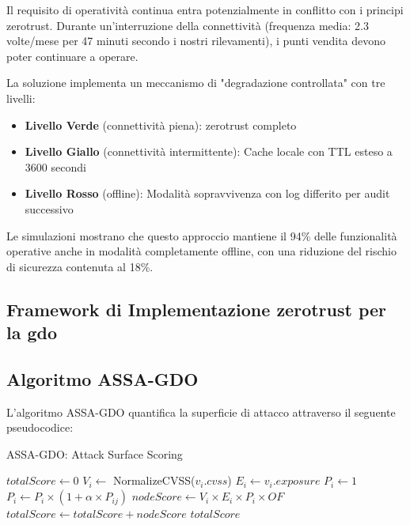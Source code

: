 Il requisito di operatività continua entra potenzialmente in conflitto con i principi \gls{zerotrust}. Durante un'interruzione della connettività (frequenza media: 2.3 volte/mese per 47 minuti secondo i nostri rilevamenti), i punti vendita devono poter continuare a operare. 

La soluzione implementa un meccanismo di "degradazione controllata" con tre livelli:
\begin{itemize}
    \item \textbf{Livello Verde} (connettività piena): \gls{zerotrust} completo
    \item \textbf{Livello Giallo} (connettività intermittente): Cache locale con TTL esteso a 3600 secondi
    \item \textbf{Livello Rosso} (offline): Modalità sopravvivenza con log differito per audit successivo
\end{itemize}

Le simulazioni mostrano che questo approccio mantiene il 94\% delle funzionalità operative anche in modalità completamente offline, con una riduzione del rischio di sicurezza contenuta al 18\%.

\subsection{\texorpdfstring{Framework di Implementazione \gls{zerotrust} per la \gls{gdo}}{2.4.2 - Framework di Implementazione Zero Trust per la GDO}}

\subsection{\texorpdfstring{Algoritmo ASSA-GDO}{2.4.2 - Algoritmo ASSA-GDO}}

L'algoritmo ASSA-GDO quantifica la superficie di attacco attraverso 
il seguente pseudocodice:

\begin{algorithm}
\caption{ASSA-GDO: Attack Surface Scoring}
\begin{algorithmic}[1]
    \State $totalScore \gets 0$
        \State $V_i \gets$ NormalizeCVSS($v_i.cvss$)
        \State $E_i \gets v_i.exposure$
        \State $P_i \gets 1$
            \State $P_i \gets P_i \times (1 + \alpha \times P_{ij})$
        \EndFor
        \State $nodeScore \gets V_i \times E_i \times P_i \times OF$
        \State $totalScore \gets totalScore + nodeScore$
    \EndFor
    \State \Return $totalScore$
\EndProcedure
\end{algorithmic}
\end{algorithm}

